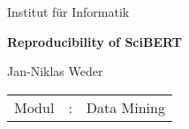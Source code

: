 \documentclass[twocolumn]{report}
\begin{document}
	
	\begin{titlepage}
		\centering
		\Large Institut für Informatik\par 
		\vspace{1.5cm}
		\huge \bfseries Reproducibility of SciBERT
		
		\vspace{2cm}
		
		\Large Jan-Niklas Weder\par
		\vfill
		\normalsize
		\mdseries 
		\begin{flushleft}
			\begin{tabular}{l l l}
			Modul&:& Data Mining\\
			\end{tabular}
		\end{flushleft}
	\end{titlepage}
		
\tableofcontents
\clearpage
{}

\setcounter{secnumdepth}{1}










\printbibliography
\end{document}
